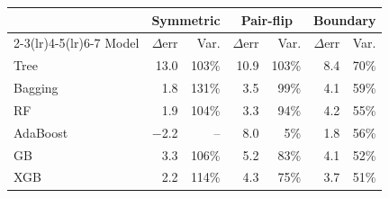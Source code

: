 \begin{tabular}{@{}lrrrrrr@{}}
\toprule
 & \multicolumn{2}{c}{Symmetric} & \multicolumn{2}{c}{Pair-flip} & \multicolumn{2}{c}{Boundary} \\
\cmidrule(lr){2-3}\cmidrule(lr){4-5}\cmidrule(lr){6-7}
Model & $\Delta$err & Var. & $\Delta$err & Var. & $\Delta$err & Var. \\
\midrule
Tree & 13.0 & 103\% & 10.9 & 103\% & 8.4 & 70\% \\
Bagging & 1.8 & 131\% & 3.5 & 99\% & 4.1 & 59\% \\
RF & 1.9 & 104\% & 3.3 & 94\% & 4.2 & 55\% \\
AdaBoost & $-$2.2 & -- & 8.0 & 5\% & 1.8 & 56\% \\
GB & 3.3 & 106\% & 5.2 & 83\% & 4.1 & 52\% \\
XGB & 2.2 & 114\% & 4.3 & 75\% & 3.7 & 51\% \\
\bottomrule
\end{tabular}